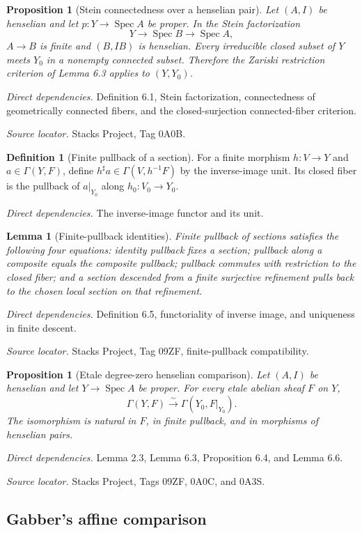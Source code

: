 \documentclass[10pt]{article}
\newtheorem{proposition}[theorem]{Proposition}
\newtheorem{lemma}[theorem]{Lemma}
\theoremstyle{definition}
\newtheorem{definition}[theorem]{Definition}
\newcommand{\Spec}{\operatorname{Spec}}
\newcommand{\deps}[1]{\par\smallskip\textit{Direct dependencies.} #1\par}
\newcommand{\sources}[1]{\par\textit{Source locator.} #1\par}
\begin{document}
\begin{proposition}[Stein connectedness over a henselian pair]
Let $(A,I)$ be henselian and let $p:Y\to\Spec A$ be proper.  In the Stein
factorization
\[
 Y\longrightarrow\Spec B\longrightarrow\Spec A,
\]
$A\to B$ is finite and $(B,IB)$ is henselian.  Every irreducible closed
subset of $Y$ meets $Y_0$ in a nonempty connected subset.  Therefore the
Zariski restriction criterion of Lemma 6.3 applies to $(Y,Y_0)$.
\end{proposition}
\deps{Definition 6.1, Stein factorization, connectedness of geometrically
connected fibers, and the closed-surjection connected-fiber criterion.}
\sources{Stacks Project, Tag 0A0B.}

\begin{definition}[Finite pullback of a section]
For a finite morphism $h:V\to Y$ and $a\in\Gamma(Y,F)$, define
$h^\sharp a\in\Gamma(V,h^{-1}F)$ by the inverse-image unit.  Its closed
fiber is the pullback of $a|_{Y_0}$ along $h_0:V_0\to Y_0$.
\end{definition}
\deps{The inverse-image functor and its unit.}

\begin{lemma}[Finite-pullback identities]
Finite pullback of sections satisfies the following four equations:
identity pullback fixes a section; pullback along a composite equals the
composite pullback; pullback commutes with restriction to the closed fiber;
and a section descended from a finite surjective refinement pulls back to
the chosen local section on that refinement.
\end{lemma}
\deps{Definition 6.5, functoriality of inverse image, and uniqueness in
finite descent.}
\sources{Stacks Project, Tag 09ZF, finite-pullback compatibility.}

\begin{proposition}[Etale degree-zero henselian comparison]
Let $(A,I)$ be henselian and let $Y\to\Spec A$ be proper.  For every etale
abelian sheaf $F$ on $Y$,
\[
 \Gamma(Y,F)\xrightarrow{\sim}\Gamma(Y_0,F|_{Y_0}).
\]
The isomorphism is natural in $F$, in finite pullback, and in morphisms of
henselian pairs.
\end{proposition}
\deps{Lemma 2.3, Lemma 6.3, Proposition 6.4, and Lemma 6.6.}
\sources{Stacks Project, Tags 09ZF, 0A0C, and 0A3S.}

\subsection{Gabber's affine comparison}
\end{document}
